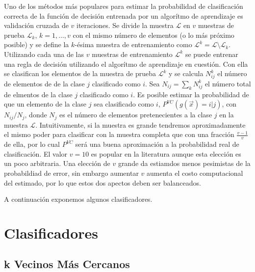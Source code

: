 \documentclass[letterpaper,12pt]{book}
\begin{document}
Uno de los métodos más populares para estimar la probabilidad de clasificación correcta de la función de decisión entrenada por un algorítmo de aprendizaje es validación cruzada de $v$ iteraciones. Se divide la muestra $\mathcal{L}$ en $v$ muestras de prueba $\mathcal{L}_{k}$, $k=1,\dots,v$ con el mismo número de elementos (o lo más próximo posible) y se define la $k$-ésima muestra de entrenamiento como $\mathcal{L}^{k} = \mathcal{L}\setminus \mathcal{L}_{k}$. Utilizando cada una de las $v$ muestras de entrenamiento $\mathcal{L}^{k}$  se puede entrenar una regla de decisión utilizando el algorítmo de aprendizaje en cuestión. Con ella se clasifican los elementos de la muestra de prueba $\mathcal{L}^{k}$ y se calcula $N_{ij}^{k}$ el número de elementos de de la clase $j$ clasificado como $i$. Sea $N_{ij}=\sum_{k}N_{ij}^{k}$ el número total de elmentos de la clase $j$ clasificado como $i$. Es posible estimar la probabilidad de que un elemento de la clase $j$ sea clasificado como $i$, $P^{VC}(g(\vec{x})=i|j)$, con $N_{ij}/N_{j}$, donde $N_{j}$ es el número de elementos pretenecientes a la clase $j$ en la muestra $\mathcal{L}$. Intuitivamente, si la muestra es grande tendremos aproximadamente el mismo poder para clasificar con la muestra completa que con una fracción $\frac{v-1}{v}$ de ella, por lo cual $P^{VC}$ será una buena aproximación a la probabilidad real de clasificación. El valor $v = 10$ es popular en la literatura aunque esta elección es un poco arbitraria. Una elección de $v$ grande da estiamdos menos pesimistas de la probabildiad de error, sin embargo aumentar $v$ aumenta el costo computacional del estimado, por lo que estos dos apectos deben ser balanceados.

A continuación exponemos algunos clasificadores.

\section{Clasificadores}

\subsection{k Vecinos Más Cercanos}
\end{document}
